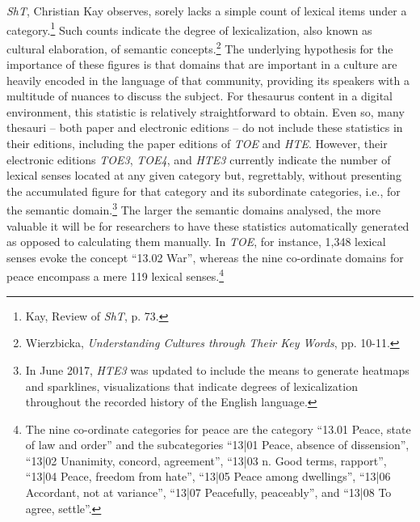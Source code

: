 \textit{ShT}, Christian Kay observes, sorely lacks a simple count of lexical items under a category.\footnote{Kay, Review of \textit{ShT}, p. 73.} Such counts indicate the degree of lexicalization, also known as cultural elaboration, of semantic concepts.\footnote{Wierzbicka, \textit{Understanding Cultures through Their Key Words}, pp. 10-11.} The underlying hypothesis for the importance of these figures is that domains that are important in a culture are heavily encoded in the language of that community, providing its speakers with a multitude of nuances to discuss the subject. For thesaurus content in a digital environment, this statistic is relatively straightforward to obtain. Even so, many thesauri -- both paper and electronic editions -- do not include these statistics in their editions, including the paper editions of \textit{TOE} and \textit{HTE}. However, their electronic editions \textit{TOE3}, \textit{TOE4}, and \textit{HTE3} currently indicate the number of lexical senses located at any given category but, regrettably, without presenting the accumulated figure for that category and its subordinate categories, i.e., for the semantic domain.\footnote{In June 2017, \textit{HTE3} was updated to include the means to generate heatmaps and sparklines, visualizations that indicate degrees of lexicalization throughout the recorded history of the English language.} The larger the semantic domains analysed, the more valuable it will be for researchers to have these statistics automatically generated as opposed to calculating them manually. In \textit{TOE}, for instance, 1,348 lexical senses evoke the concept ``13.02 War'', whereas the nine co-ordinate domains for peace encompass a mere 119 lexical senses.\footnote{The nine co-ordinate categories for peace are the category ``13.01 Peace, state of law and order'' and the subcategories ``13|01 Peace, absence of dissension'', ``13|02 Unanimity, concord, agreement'', ``13|03 n. Good terms, rapport'', ``13|04 Peace, freedom from hate'', ``13|05 Peace among dwellings'', ``13|06 Accordant, not at variance'', ``13|07 Peacefully, peaceably'', and ``13|08 To agree, settle''.}


